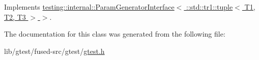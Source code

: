 Implements \hyperlink{classtesting_1_1internal_1_1_param_generator_interface_ae82e6fc79efcef1c794ad333ffb5bf80}{testing\-::internal\-::\-Param\-Generator\-Interface$<$ \-::std\-::tr1\-::tuple$<$ T1, T2, T3 $>$ $>$}.



The documentation for this class was generated from the following file\-:\begin{DoxyCompactItemize}
\item 
lib/gtest/fused-\/src/gtest/\hyperlink{fused-src_2gtest_2gtest_8h}{gtest.\-h}\end{DoxyCompactItemize}

